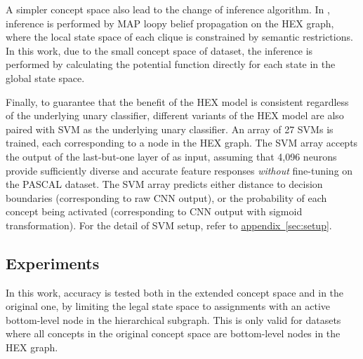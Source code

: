 \documentclass[11pt,a4paper]{article}
\begin{document}
A simpler concept space also lead to the change of inference algorithm. In \cite{deng2014large}, inference is performed by MAP loopy belief propagation on the HEX graph, where the local state space of each clique is constrained by semantic restrictions. In this work, due to the small concept space of dataset, the inference is performed by calculating the potential function directly for each state in the global state space.

Finally, to guarantee that the benefit of the HEX model is consistent regardless of the underlying unary classifier, different variants of the HEX model are also paired with SVM as the underlying unary classifier. An array of 27 SVMs is trained, each corresponding to a node in the HEX graph. The SVM array accepts the output of the last-but-one layer of \cite{krizhevsky2012imagenet} as input, assuming that 4,096 neurons provide sufficiently diverse and accurate feature responses \emph{without} fine-tuning on the PASCAL dataset. The SVM array predicts either distance to decision boundaries (corresponding to raw CNN output), or the probability of each concept being activated (corresponding to CNN output with sigmoid transformation). For the detail of SVM setup, refer to \hyperref[sec:setup]{appendix~\ref{sec:setup}}.

\subsection{Experiments}
\label{sec:exp1}

In this work, accuracy is tested both in the extended concept space and in the original one, by limiting the legal state space to assignments with an active bottom-level node in the hierarchical subgraph. This is only valid for datasets where all concepts in the original concept space are bottom-level nodes in the HEX graph.
\end{document}
